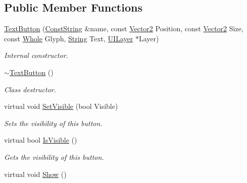 \subsection*{Public Member Functions}
\begin{DoxyCompactItemize}
\item 
\hyperlink{classphys_1_1UI_1_1TextButton_a319fd053824be479335d15df5f21131f}{TextButton} (\hyperlink{namespacephys_a5ce5049f8b4bf88d6413c47b504ebb31}{ConstString} \&name, const \hyperlink{classphys_1_1Vector2}{Vector2} Position, const \hyperlink{classphys_1_1Vector2}{Vector2} Size, const \hyperlink{namespacephys_a460f6bc24c8dd347b05e0366ae34f34a}{Whole} Glyph, \hyperlink{namespacephys_aa03900411993de7fbfec4789bc1d392e}{String} Text, \hyperlink{classphys_1_1UILayer}{UILayer} $\ast$Layer)
\begin{DoxyCompactList}\small\item\em Internal constructor. \item\end{DoxyCompactList}\item 
\hypertarget{classphys_1_1UI_1_1TextButton_a1f28489fee45ee8ce7e1b0aea0f249a1}{
\hyperlink{classphys_1_1UI_1_1TextButton_a1f28489fee45ee8ce7e1b0aea0f249a1}{$\sim$TextButton} ()}
\label{df/d03/classphys_1_1UI_1_1TextButton_a1f28489fee45ee8ce7e1b0aea0f249a1}

\begin{DoxyCompactList}\small\item\em Class destructor. \item\end{DoxyCompactList}\item 
virtual void \hyperlink{classphys_1_1UI_1_1TextButton_a07e030ef92f314b1eff663cbc1712d42}{SetVisible} (bool Visible)
\begin{DoxyCompactList}\small\item\em Sets the visibility of this button. \item\end{DoxyCompactList}\item 
virtual bool \hyperlink{classphys_1_1UI_1_1TextButton_a505167a00d343d704df1f759cd12ed1e}{IsVisible} ()
\begin{DoxyCompactList}\small\item\em Gets the visibility of this button. \item\end{DoxyCompactList}\item 
\hypertarget{classphys_1_1UI_1_1TextButton_add95c812af6ef7584a2d515a33bac72b}{
virtual void \hyperlink{classphys_1_1UI_1_1TextButton_add95c812af6ef7584a2d515a33bac72b}{Show} ()}
\label{df/d03/classphys_1_1UI_1_1TextButton_add95c812af6ef7584a2d515a33bac72b}


\end{DoxyCompactItemize}
